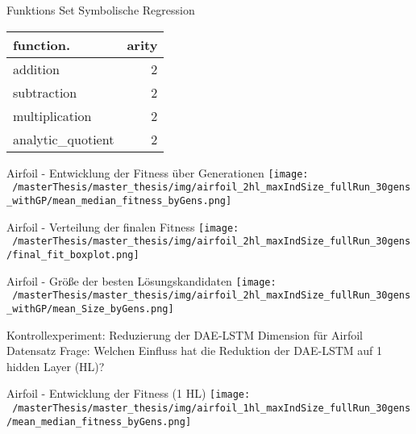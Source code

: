 \documentclass[
  ignorenonframetext,
]{beamer}
\begin{document}
\begin{frame}{Funktions Set Symbolische Regression}
\protect\hypertarget{funktions-set-symbolische-regression}{}
\begin{table}[!h]
\centering
\begin{tabular}{l|r}
\hline
\textbf{function.} & \textbf{arity}\\
\hline
addition & 2\\
\hline
subtraction & 2\\
\hline
multiplication & 2\\
\hline
analytic\_quotient & 2\\
\hline
\end{tabular}
\end{table}
\end{frame}

\begin{frame}{Airfoil - Entwicklung der Fitness über Generationen}
\protect\hypertarget{airfoil---entwicklung-der-fitness-uxfcber-generationen}{}
\texttt{[image: ~/masterThesis/master\_thesis/img/airfoil\_2hl\_maxIndSize\_fullRun\_30gens\_withGP/mean\_median\_fitness\_byGens.png]}
\end{frame}

\begin{frame}{Airfoil - Verteilung der finalen Fitness}
\protect\hypertarget{airfoil---verteilung-der-finalen-fitness}{}
\texttt{[image: ~/masterThesis/master\_thesis/img/airfoil\_2hl\_maxIndSize\_fullRun\_30gens/final\_fit\_boxplot.png]}
\end{frame}

\begin{frame}{Airfoil - Größe der besten Lösungskandidaten}
\protect\hypertarget{airfoil---gruxf6uxdfe-der-besten-luxf6sungskandidaten}{}
\texttt{[image: ~/masterThesis/master\_thesis/img/airfoil\_2hl\_maxIndSize\_fullRun\_30gens\_withGP/mean\_Size\_byGens.png]}
\end{frame}

\begin{frame}{Kontrollexperiment: Reduzierung der DAE-LSTM Dimension für
Airfoil Datensatz}
\protect\hypertarget{kontrollexperiment-reduzierung-der-dae-lstm-dimension-fuxfcr-airfoil-datensatz}{}
Frage: Welchen Einfluss hat die Reduktion der DAE-LSTM auf 1 hidden
Layer (HL)?
\end{frame}

\begin{frame}{Airfoil - Entwicklung der Fitness (1 HL)}
\protect\hypertarget{airfoil---entwicklung-der-fitness-1-hl}{}
\texttt{[image: ~/masterThesis/master\_thesis/img/airfoil\_1hl\_maxIndSize\_fullRun\_30gens/mean\_median\_fitness\_byGens.png]}
\end{frame}
\end{document}
